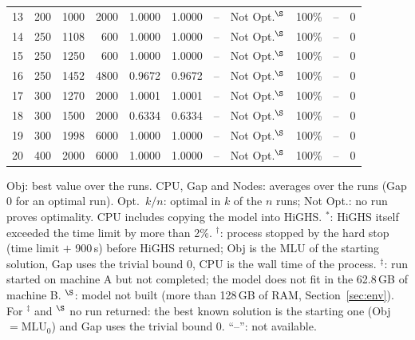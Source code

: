 \documentclass[conference]{IEEEtran}
\newcommand{\MLU}{\mathrm{MLU}}
\begin{document}
\begin{table}[t]
\begin{tabular}{@{}rrrrrrrlrrr@{}}
13 & 200 & 1000 & 2000 & 1.0000 & 1.0000 & -- & Not Opt.$^\S$ & 100\% & -- & 0\\
14 & 250 & 1108 & 600 & 1.0000 & 1.0000 & -- & Not Opt.$^\S$ & 100\% & -- & 0\\
15 & 250 & 1250 & 600 & 1.0000 & 1.0000 & -- & Not Opt.$^\S$ & 100\% & -- & 0\\
16 & 250 & 1452 & 4800 & 0.9672 & 0.9672 & -- & Not Opt.$^\S$ & 100\% & -- & 0\\
17 & 300 & 1270 & 2000 & 1.0001 & 1.0001 & -- & Not Opt.$^\S$ & 100\% & -- & 0\\
18 & 300 & 1500 & 2000 & 0.6334 & 0.6334 & -- & Not Opt.$^\S$ & 100\% & -- & 0\\
19 & 300 & 1998 & 6000 & 1.0000 & 1.0000 & -- & Not Opt.$^\S$ & 100\% & -- & 0\\
20 & 400 & 2000 & 6000 & 1.0000 & 1.0000 & -- & Not Opt.$^\S$ & 100\% & -- & 0\\
\bottomrule
\end{tabular}
\par\smallskip\parbox{0.97\textwidth}{\scriptsize Obj: best value over the runs. CPU, Gap and Nodes: averages over the runs (Gap 0 for an optimal run). Opt.~$k/n$: optimal in $k$ of the $n$ runs; Not Opt.: no run proves optimality. CPU includes copying the model into HiGHS. $^*$: HiGHS itself exceeded the time limit by more than 2\%. $^\dagger$: process stopped by the hard stop (time limit $+$ 900\,s) before HiGHS returned; Obj is the MLU of the starting solution, Gap uses the trivial bound 0, CPU is the wall time of the process. $^\ddagger$: run started on machine A but not completed; the model does not fit in the 62.8\,GB of machine B. $^\S$: model not built (more than 128\,GB of RAM, Section~\ref{sec:env}). For $^\ddagger$ and $^\S$ no run returned: the best known solution is the starting one (Obj $=\MLU_0$) and Gap uses the trivial bound 0. ``--'': not available.}
\end{table}
\end{document}
